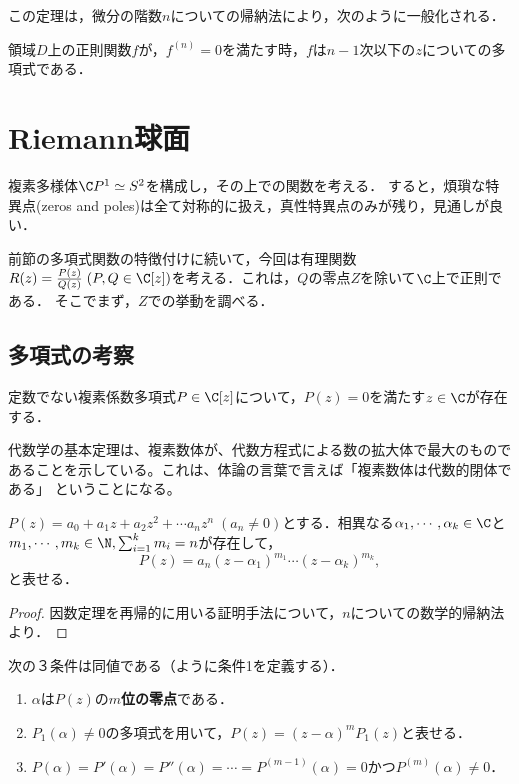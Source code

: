 \documentclass[uplatex, dvipdfmx]{jsreport}
\begin{document}
この定理は，微分の階数$n$についての帰納法により，次のように一般化される．

\begin{proposition}
    領域$D$上の正則関数$f$が，$f^{(n)}=0$を満たす時，$f$は$n-1$次以下の$z$についての多項式である．
\end{proposition}

\section{Riemann球面}

\begin{screen}
    複素多様体$\C P^1\simeq S^2$を構成し，その上での関数を考える．
    すると，煩瑣な特異点(zeros and poles)は全て対称的に扱え，真性特異点のみが残り，見通しが良い．

\end{screen}

前節の多項式関数の特徴付けに続いて，今回は有理関数$R(z)=\frac{P(z)}{Q(z)}\;(P,Q\in\C[z])$を考える．これは，$Q$の零点$Z$を除いて$\C$上で正則である．
そこでまず，$Z$での挙動を調べる．

\subsection{多項式の考察}

\begin{theorem}
    定数でない複素係数多項式$P\in\C[z]$について，$P(z)=0$を満たす$z\in\C$が存在する．
\end{theorem}
\begin{remark}
    代数学の基本定理は、複素数体が、代数方程式による数の拡大体で最大のものであることを示している。これは、体論の言葉で言えば「複素数体は代数的閉体である」 ということになる。
\end{remark}

\begin{corollary}
    $P(z)=a_0+a_1z+a_2z^2+\cdots a_nz^n\;(a_n\ne 0)$とする．相異なる$\alpha_1,\cdots,\alpha_k\in\C$と$m_1,\cdots,m_k\in\N, \sum_{i=1}^km_i=n$が存在して，
    \[ P(z)=a_n(z-\alpha_1)^{m_1}\cdots(z-\alpha_k)^{m_k}, \]
    と表せる．
\end{corollary}
\begin{proof}
    因数定理を再帰的に用いる証明手法について，$n$についての数学的帰納法より．
\end{proof}

\begin{proposition}\label{prop-multiplicity}
    次の３条件は同値である（ように条件1を定義する）．
    \begin{enumerate}
        \item $\alpha$は$P(z)$の\textbf{$m$位の零点}である．
        \item $P_1(\alpha)\ne 0$の多項式を用いて，$P(z)=(z-\alpha)^mP_1(z)$と表せる．
        \item $P(\alpha)=P'(\alpha)=P''(\alpha)=\cdots=P^{(m-1)}(\alpha)=0$かつ$P^{(m)}(\alpha)\ne 0$．
    \end{enumerate}
\end{proposition}
\end{document}
